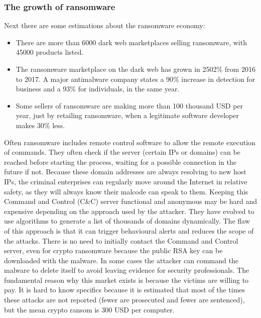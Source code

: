 \subsubsection{The growth of ransomware}
Next there are some estimations about the ransomware economy\cite{ransomware_economy}:
\begin{itemize}
	\item There are more than 6000 dark web marketplaces selling ransomware, with 45000 products listed.
	\item The ransomware marketplace on the dark web has grown in 2502\% from 2016 to 2017.
A major antimalware company states a 90\% increase in detection for business and a 93\% for individuals, in the same year\cite{ransomware_malwarebytes}.
	\item Some sellers of ransomware are making more than 100 thousand USD per year, just by retailing ransomware, when a legitimate software developer makes 30\% less.
\end{itemize}
\linej
Often ransomware includes remote control software to allow the remote execution of commands.
They often check if the server (certain IPs or domains) can be reached before starting the process, waiting for a possible connection in the future if not.
Because these domain addresses are always resolving to new host IPs, the criminal enterprises can regularly move around the Internet in relative safety, as they will always know their malcode can speak to them.
Keeping this Command and Control (C\&C) server functional and anonymous may be hard and expensive depending on the approach used by the attacker.
They have evolved to use algorithms to generate a list of thousands of domains dynamically.
\linej
The flaw of this approach is that it can trigger behavioural alerts and reduces the scope of the attacks.
There is no need to initially contact the Command and Control server, even for crypto ransomware because the public RSA key can be downloaded with the malware.
In some cases the attacker can command the malware to delete itself to avoid leaving evidence for security professionals\cite{ransomware_oReilly}\cite{ransomware_digital_extortion}.
\linej
\linej
The fundamental reason why this market exists is because the victims are willing to pay.
It is hard to know specifics because it is estimated that most of the times these attacks are not reported (fewer are prosecuted and fewer are sentenced), but the mean crypto ransom is 300 USD per computer\cite{ransomware_digital_extortion}.
\linej
